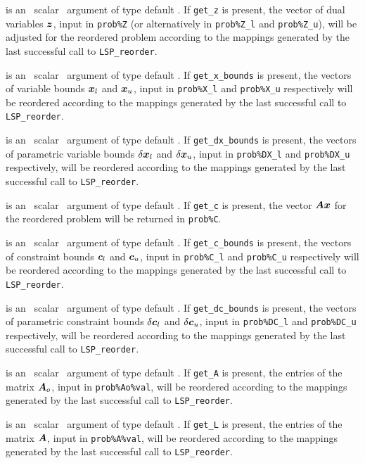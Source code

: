 \documentclass{galahad}
\newcommand{\packagename}{LSP}
\begin{document}
\begin{description}
is an \optional\ scalar \intentin\ argument of type default \logical. 
If {\tt get\_z} is present, the vector of dual variables ${\bm{z}}$, input in 
{\tt prob\%Z} (or alternatively in {\tt prob\%Z\_l} and {\tt prob\%Z\_u}),
will be adjusted for the reordered problem according 
to the mappings generated by the last successful 
call to {\tt \packagename\_reorder}. 
 
is an \optional\ scalar \intentin\ argument of type default \logical. 
If {\tt get\_x\_bounds} is present, 
the vectors of variable bounds ${\bm{x}}_l$ and 
${\bm{x}}_u$, input in {\tt prob\%X\_l} and {\tt prob\%X\_u} respectively
will be reordered according to the 
mappings generated by the last successful call to {\tt \packagename\_reorder}. 
 
is an \optional\ scalar \intentin\ argument of type default \logical. 
If {\tt get\_dx\_bounds} is present, 
the vectors of parametric variable bounds $\delta {\bm{x}}_l$ and 
$\delta {\bm{x}}_u$, input in {\tt prob\%DX\_l} and {\tt prob\%DX\_u} respectively,
will be reordered according to the 
mappings generated by the last successful call to {\tt \packagename\_reorder}. 
 
is an \optional\ scalar \intentin\ argument of type default \logical. 
If {\tt get\_c} is present, the vector ${\bm{A}} {\bm{x}}$ for the reordered problem 
will be returned in {\tt prob\%C}. 
 
is an \optional\ scalar \intentin\ argument of type default \logical. 
If {\tt get\_c\_bounds} is present, 
the vectors of constraint bounds ${\bm{c}}_l$ and 
${\bm{c}}_u$, input in {\tt prob\%C\_l} and {\tt prob\%C\_u} respectively
will be reordered according to the 
mappings generated by the last successful call to {\tt \packagename\_reorder}. 
 
is an \optional\ scalar \intentin\ argument of type default \logical. 
If {\tt get\_dc\_bounds} is present, 
the vectors of parametric constraint bounds $\delta {\bm{c}}_l$ and 
$\delta {\bm{c}}_u$, input in {\tt prob\%DC\_l} and {\tt prob\%DC\_u} respectively,
will be reordered according to the 
mappings generated by the last successful call to {\tt \packagename\_reorder}. 
 
is an \optional\ scalar \intentin\ argument of type default \logical. 
If {\tt get\_A} is present, the entries of the 
matrix ${\bm{A}}_o$, input in {\tt prob\%Ao\%val}, will be reordered according 
to the 
mappings generated by the last successful call to {\tt \packagename\_reorder}. 
 
is an \optional\ scalar \intentin\ argument of type default \logical. 
If {\tt get\_L} is present, the entries of the 
matrix ${\bm{A}}$, input in {\tt prob\%A\%val}, will be reordered according to the 
mappings generated by the last successful call to {\tt \packagename\_reorder}. 
 
\end{description}
\end{document}

